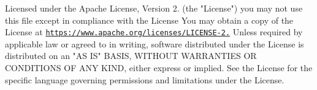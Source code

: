 



Licensed under the Apache License, Version 2. (the "License") you may not use this file except in compliance with the License You may obtain a copy of the License at \href{https://www.apache.org/licenses/LICENSE-2.0}{\tt https\-://www.\-apache.\-org/licenses/\-L\-I\-C\-E\-N\-S\-E-\/2.} Unless required by applicable law or agreed to in writing, software distributed under the License is distributed on an "A\-S I\-S" B\-A\-S\-I\-S, W\-I\-T\-H\-O\-U\-T W\-A\-R\-R\-A\-N\-T\-I\-E\-S O\-R C\-O\-N\-D\-I\-T\-I\-O\-N\-S O\-F A\-N\-Y K\-I\-N\-D, either express or implied. See the License for the specific language governing permissions and limitations under the License. 